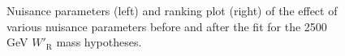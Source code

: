 \begin{figure}[H]
  \centering
  \caption{Nuisance parameters (left) and ranking plot (right) of the effect of various nuisance parameters before and after the fit for the 2500 GeV $W'_{\text{R}}$ mass hypotheses.}
  \label{fig:NuisParAndRanking_WpRH2500}
\end{figure}
